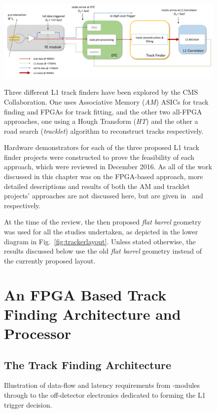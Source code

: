 \begin{figure}[tb]
\centering
\includegraphics[width=\textwidth]{figs/tk-upgrade/dataflow.pdf}
\caption{Illustration of data-flow and latency requirements from \pt-modules through to the off-detector electronics dedicated to forming the L1 trigger decision.}
\label{fig:dataFlow}

Three different L1 track finders have been explored by the CMS Collaboration.
One uses Associative Memory (\emph{AM}) ASICs for track finding and FPGAs for track fitting, and the other two all-FPGA approaches, one using a Hough Transform (\emph{HT}) and the other a road search (\emph{tracklet}) algorithm to reconstruct tracks respectively.

Hardware demonstrators for each of the three proposed L1 track finder projects were constructed to prove the feasibility of each approach, which were reviewed in December 2016.
As all of the work discussed in this chapter was on the FPGA-based \HT approach, more detailed descriptions and results of both the AM and tracklet projects' approaches are not discussed here, but are given in~\cite{AM,P2TrackerTDR} and~\cite{tracklet,P2TrackerTDR} respectively.

At the time of the review, the then proposed \emph{flat barrel} geometry~\cite{CMS_Upgrade_TP} was used for all the studies undertaken, as depicted in the lower diagram in Fig.~\ref{fig:trackerlayout}.
Unless stated otherwise, the results discussed below use the old \emph{flat barrel} geometry instead of the currently proposed layout.

\section{An FPGA Based Track Finding Architecture and Processor}
\subsection{The Track Finding Architecture}


\end{figure}
